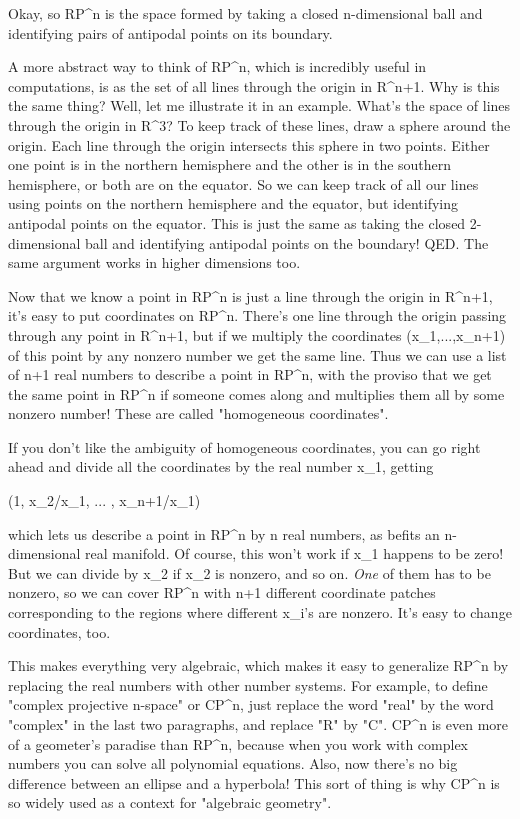 Okay, so RP^{n} is the space formed by taking a closed n-dimensional ball
and identifying pairs of antipodal points on its boundary.

A more abstract way to think of RP^{n}, which is incredibly useful in
computations, is as the set of all lines through  the origin in R^{n+1}.
Why is this the same thing?  Well, let me illustrate it in an example.
What's the space of lines through the origin in R^{3}?  To keep track of
these lines, draw a sphere around the origin.  Each line through the
origin intersects this sphere in two points.  Either one point is in the
northern hemisphere and the other is in the southern hemisphere, or 
both are on the equator.  So we can keep track of all our lines using
points on the northern hemisphere and the equator, but identifying
antipodal points on the equator.  This is just the same as taking the
closed 2-dimensional ball and identifying antipodal points on the
boundary!  QED.  The same argument works in higher dimensions too.

Now that we know a point in RP^{n} is just a line through the origin in
R^{n+1}, it's easy to put coordinates on RP^{n}.  
There's one line through
the origin passing through any point in R^{n+1}, but if we 
multiply the
coordinates (x_{1},...,x_{n+1}) of this point by any 
nonzero number we 
get the same line.  Thus we can use a list of n+1 real numbers 
to describe a point in RP^{n}, with the proviso that we get the same
point in RP^{n} if someone comes along and multiplies them all by 
some nonzero number!  These are called "homogeneous coordinates".   

If you don't like the ambiguity of homogeneous coordinates, you can go
right ahead and divide all the coordinates by the real number x_{1},
getting

(1, x_{2}/x_{1}, ... , x_{n+1}/x_{1}) 

which lets us describe a point in RP^{n} by n real numbers, as befits an
n-dimensional real manifold.  Of course, this won't work if x_{1}
happens to be zero!  But we can divide by x_{2} if x_{2} is nonzero, and
so on.  \emph{One} of them has to be nonzero, so we can cover RP^{n} with n+1
different coordinate patches corresponding to the regions where
different x_{i}'s are nonzero.  It's easy to change coordinates, too.

This makes everything very algebraic, which makes it easy to
generalize RP^{n} by replacing the real numbers with other number
systems.  For example, to define "complex projective n-space" or CP^{n},
just replace the word "real" by the word "complex" in the last two
paragraphs, and replace "R" by "C".  CP^{n} is even more of a geometer's
paradise than RP^{n}, because when you work with complex numbers you can
solve all polynomial equations.  Also, now there's no big difference
between an ellipse and a hyperbola!  This sort of thing is why CP^{n} is
so widely used as a context for "algebraic geometry".

